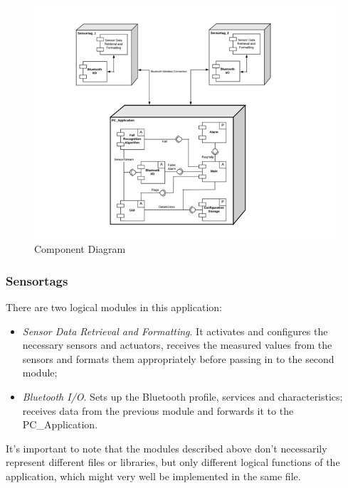 \documentclass[conference,12pt]{IEEETran}
\begin{document}
\FloatBarrier
\begin{figure}[!h]
	\centering
	\includegraphics[scale=0.65]{images/Comp_Diag.png}
	\caption{Component Diagram}
	\label{img:Comp_Diag}
\end{figure}
\FloatBarrier

\subsubsection{Sensortags}
There are two logical modules in this application:

\begin{itemize}
	\item \textit{Sensor Data Retrieval and Formatting}. It activates and configures the necessary sensors and actuators, receives the measured values from the sensors and formats them appropriately before passing in to the second module;
	\item \textit{Bluetooth I/O}. Sets up the Bluetooth profile, services and characteristics; receives data from the previous module and forwards it to the PC\_Application.
\end{itemize}
It’s important to note that the modules described above don’t necessarily represent different files or libraries, but only different logical functions of the application, which might very well be implemented in the same file.
\end{document}
